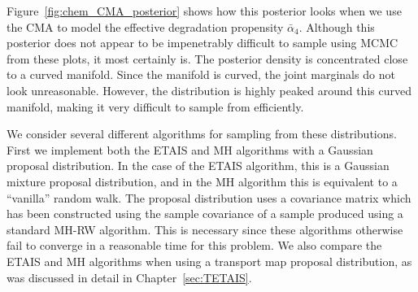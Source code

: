 \documentclass[final]{siamltex}
\newcommand\irregularcircle[2]{%
  \pgfextra {\pgfmathsetmacro\len{(#1)+rand*(#2)}}
  +(0:\len pt)
  \foreach \a in {10,20,...,350}{
    \pgfextra {\pgfmathsetmacro\len{(#1)+rand*(#2)}}
    -- +(\a:\len pt)
  } -- cycle
}
\begin{document}
Figure~\ref{fig:chem_CMA_posterior} shows how this posterior looks
when we use the CMA to model the effective degradation propensity
$\bar{\alpha}_4$. Although this posterior does not appear to be
impenetrably difficult to sample using MCMC from these plots, it most certainly is. The posterior
density is concentrated close to a curved manifold. Since the manifold
is curved, the joint marginals do not look unreasonable. However,
the distribution
is highly peaked around this curved manifold, making it very difficult
to sample from efficiently.

We consider several different algorithms for sampling from these
distributions. First we implement both the ETAIS and MH algorithms with
a Gaussian proposal distribution. In the case of the ETAIS algorithm,
this is a Gaussian mixture proposal distribution, and in the MH
algorithm this is equivalent to a ``vanilla'' random walk. The proposal
distribution uses a covariance matrix which has been constructed using
the sample covariance of a sample produced using a standard MH-RW
algorithm. This is necessary since these algorithms otherwise fail to
converge in a reasonable time for
this problem. We also compare the ETAIS and MH algorithms when using a
transport map proposal distribution, as was discussed in detail in Chapter~\ref{sec:TETAIS}.








\end{document}
